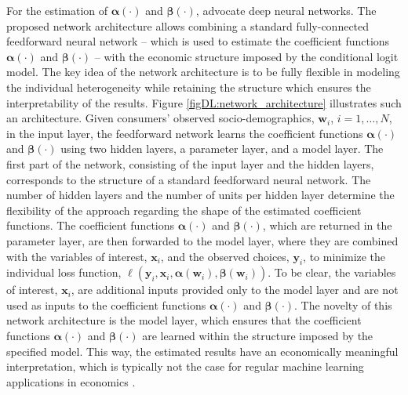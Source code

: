 \documentclass[a4paper, 12pt]{article}
\begin{document}
For the estimation of $\bm{\alpha}(\cdot)$ and $\bm{\beta}(\cdot)$,  advocate deep neural networks. The proposed network architecture allows combining a standard fully-connected feedforward neural network -- which is used to estimate the coefficient functions $\bm{\alpha}(\cdot)$ and $\bm{\beta}(\cdot)$ -- with the economic structure imposed by the conditional logit model. The key idea of the network architecture is to be fully flexible in modeling the individual heterogeneity while retaining the structure which ensures the interpretability of the results.
Figure \ref{figDL:network_architecture} illustrates such an architecture.
Given consumers' observed socio-demographics, $\bm{w}_i$, $i=1,\ldots,N$, in the input layer, the feedforward network learns the coefficient functions $\bm{\alpha}(\cdot)$ and $\bm{\beta}(\cdot)$ using two hidden layers, a parameter layer, and a model layer. The first part of the network, consisting of the input layer and the hidden layers, corresponds to the structure of a standard feedforward neural network. The number of hidden layers and the number of units per hidden layer determine the flexibility of the approach regarding the shape of the estimated coefficient functions. The coefficient functions $\bm{\alpha}(\cdot)$ and $\bm{\beta}(\cdot)$, which are returned in the parameter layer,  are then forwarded to the model layer, where they are combined with the variables of interest, $\bm{x}_i$, and the observed choices, $\bm{y}_i$, to minimize the individual loss function, $\ell\left(\bm{y}_i, \bm{x}_i, \bm{\alpha}\left(\bm{w}_i\right), \bm{\beta}\left(\bm{w}_i\right)\right)$. To be clear, the variables of interest, $\bm{x}_i$,  are additional inputs provided only to the model layer and are not used as inputs to the coefficient functions $\bm{\alpha}(\cdot)$ and $\bm{\beta}(\cdot)$. The novelty of this network architecture is the model layer, which ensures that the coefficient functions $\bm{\alpha}(\cdot)$ and $\bm{\beta}(\cdot)$ are learned within the structure imposed by the specified model. This way, the estimated results have an economically meaningful interpretation, which is typically not the case for regular machine learning applications in economics \cite{farrell2020}.
\end{document}
